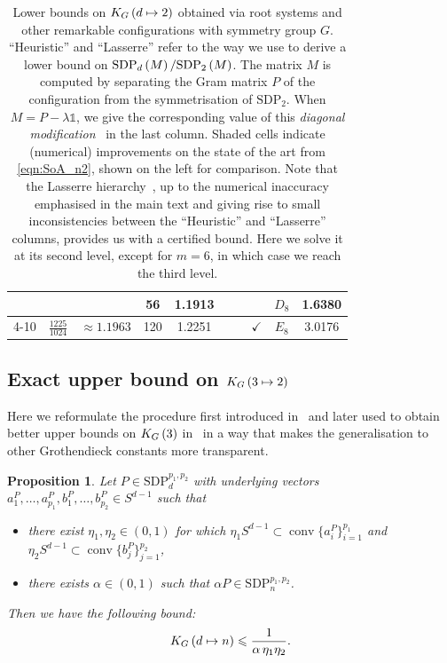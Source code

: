 \documentclass[10pt,aps,notitlepage,onecolumn,pra,superscriptaddress]{revtex4-1}
\DeclareMathOperator{\conv}{conv}
\newtheorem{proposition}{Proposition}
\renewcommand{\leq}{\leqslant}
\newcommand{\cc}{\cellcolor[gray]{0.9}}
\newcommand\cut[2]{\mathrm{SDP}_{#1}^{#2}}
\newcommand{\id}{\mathds{1}}
\newcommand\KG[2]{K_G\left({#1}\ifx#2\empty\else\mapsto\fi{#2}\right)}
\newcommand\sdp[2]{\mathrm{SDP}_{#1}\ifx#2\empty\else\left({#2}\right)\fi}
\begin{document}
\begin{table}[ht!]
\begin{tabular}{|c|cl|c|c|c|c|c|c|c|}
                        &                                            &                                        & 56                  & 1.1913      &            &                       &              & $D_8$                   & 1.6380    \\ \cline{4-10}
    \multirow{-2}{*}{8} & \multirow{-2}{*}{$\frac{1225}{1024}$}      & \multirow{-2}{*}{$\approx1.1963$}      & 120                 & \cc1.2251   &            &                       & $\checkmark$ & $E_8$                   & 3.0176    \\ \hline
  \end{tabular}
  \caption{
    Lower bounds on $\KG{d}{2}$ obtained via root systems and other remarkable configurations with symmetry group $G$.
    ``Heuristic'' and ``Lasserre'' refer to the way we use to derive a lower bound on $\sdp{d}{M}/\sdp{2}{M}$.
    The matrix $M$ is computed by separating the Gram matrix $P$ of the configuration from the symmetrisation of $\cut{2}{}$.
    When $M=P-\lambda\id$, we give the corresponding value of this \emph{diagonal modification}~\cite{FR94} in the last column.
    Shaded cells indicate (numerical) improvements on the state of the art from \cref{eqn:SoA_n2}, shown on the left for comparison.
    Note that the Lasserre hierarchy~\cite{Las01}, up to the numerical inaccuracy emphasised in the main text and giving rise to small inconsistencies between the ``Heuristic'' and ``Lasserre'' columns, provides us with a certified bound.
    Here we solve it at its second level, except for $m=6$, in which case we reach the third level.
  }
  \label{tab:sym_n2}
\end{table}

\subsection{Exact upper bound on \texorpdfstring{$\KG{3}{2}$}{KG(3->2)}}
\label{sec:up_n2}

Here we reformulate the procedure first introduced in~\cite{CGRS16,HQV+16} and later used to obtain better upper bounds on $\KG{3}{}$ in~\cite{HQV+17,DIB+23} in a way that makes the generalisation to other Grothendieck constants more transparent.

\begin{proposition}
  Let $P\in\cut{d}{p_1,p_2}$ with underlying vectors $a_1^P,\ldots,a_{p_1}^P,b_1^P,\ldots,b_{p_2}^P\in S^{d-1}$ such that
  \begin{itemize}
    \item there exist $\eta_1,\eta_2\in(0,1)$ for which $\eta_1S^{d-1}\subset\conv\{a_i^P\}_{i=1}^{p_1}$ and $\eta_2S^{d-1}\subset\conv\{b_j^P\}_{j=1}^{p_2}$,
    \item there exists $\alpha\in(0,1)$ such that $\alpha P\in\cut{n}{p_1,p_2}$.
  \end{itemize}
  Then we have the following bound:
  \begin{equation}
    \KG{d}{n}\leq\frac{1}{\alpha\,\eta_1\eta_2}.
    \label{eqn:upper}
  \end{equation}
  \label{prop:upper}
\end{proposition}
\end{document}
